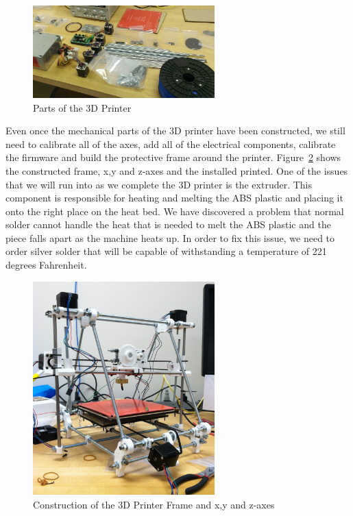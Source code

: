 \documentclass[pdftex,10.5pt]{report}
\begin{document}
\begin{figure}[H]
	\centering
	\includegraphics[width=70mm]{figures/WP_20130223_002.jpg}
	\caption{Parts of the 3D Printer}
	\label{parts}
\end{figure}

Even once the mechanical parts of the 3D printer have been constructed, we still need to calibrate all of the axes, add all of the electrical components, calibrate the firmware and build the protective frame around the printer. Figure~\ref{basebuilt} shows the constructed frame, x,y and z-axes and the installed printed. One of the issues that we will run into as we complete the 3D printer is the extruder. This component is responsible for heating and melting the ABS plastic and placing it onto the right place on the heat bed. We have discovered a problem that normal solder cannot handle the heat that is needed to melt the ABS plastic and the piece falls apart as the machine heats up. In order to fix this issue, we need to order silver solder that will be capable of withstanding a temperature of 221 degrees Fahrenheit. 

\begin{figure}[H]
	\centering
	\includegraphics[width=70mm]{figures/photo.JPG}
	\caption{Construction of the 3D Printer Frame and x,y and z-axes}
	\label{basebuilt}
\end{figure}
\end{document}
